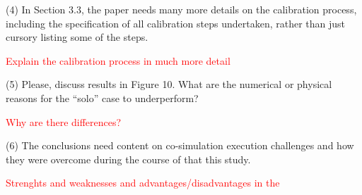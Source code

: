 \documentclass[answers,12pt]{exam}
\begin{document}
\begin{questions}
\question 
(4) In Section 3.3, the paper needs many more details on the calibration process, including the specification of all calibration steps undertaken, rather than just cursory listing some of the steps. 
\begin{solution}
\textcolor{red}{Explain the calibration process in much more detail}
\end{solution}

\question 
(5) Please, discuss results in Figure 10. What are the numerical or physical reasons for the “solo” case to underperform? 
\begin{solution}
\textcolor{red}{Why are there differences?}

\end{solution}

\question 
(6) The conclusions need content on co-simulation execution challenges and how they were overcome during the course of that this study.
\begin{solution}
\textcolor{red}{Strenghts and weaknesses and advantages/disadvantages in the}

\end{solution}
\end{questions}
\end{document}
